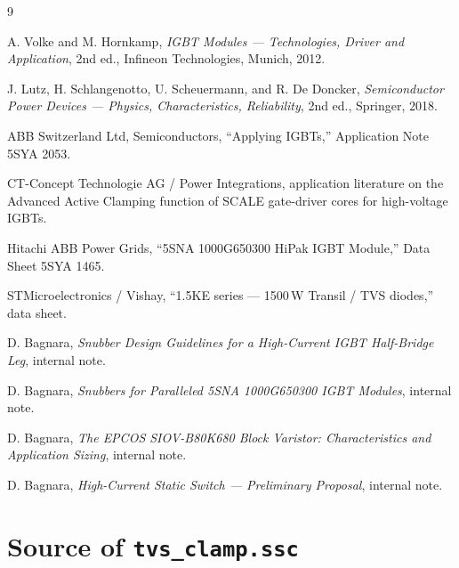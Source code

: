 \documentclass[11pt,a4paper]{article}
\begin{document}
\begin{thebibliography}{9}

 A. Volke and M. Hornkamp, \emph{IGBT Modules ---
Technologies, Driver and Application}, 2nd ed., Infineon Technologies,
Munich, 2012.

 J. Lutz, H. Schlangenotto, U. Scheuermann, and
R. De Doncker, \emph{Semiconductor Power Devices --- Physics,
Characteristics, Reliability}, 2nd ed., Springer, 2018.

 ABB Switzerland Ltd, Semiconductors, ``Applying
IGBTs,'' Application Note 5SYA 2053.

 CT-Concept Technologie AG / Power Integrations,
application literature on the Advanced Active Clamping function of
SCALE gate-driver cores for high-voltage IGBTs.

 Hitachi ABB Power Grids, ``5SNA 1000G650300 HiPak IGBT
Module,'' Data Sheet 5SYA 1465.

 STMicroelectronics / Vishay, ``1.5KE series ---
1500\,W Transil / TVS diodes,'' data sheet.

 D. Bagnara, \emph{Snubber Design Guidelines for a
High-Current IGBT Half-Bridge Leg}, internal note.

 D. Bagnara, \emph{Snubbers for Paralleled 5SNA
1000G650300 IGBT Modules}, internal note.

 D. Bagnara, \emph{The EPCOS SIOV-B80K680 Block
Varistor: Characteristics and Application Sizing}, internal note.

 D. Bagnara, \emph{High-Current Static Switch ---
Preliminary Proposal}, internal note.

\end{thebibliography}

\appendix
\section{Source of \texttt{tvs\_clamp.ssc}}
\label{app:code}
\end{document}
